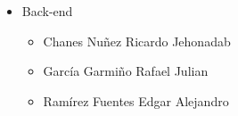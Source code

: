 \documentclass[12pt,letterpaper]{article}
\begin{document}
\begin{itemize}
\begin{itemize}
\begin{itemize}
\begin{itemize}
                                \end{itemize}
                                \item Back-end
                                \begin{itemize}
                                    \item Chanes Nuñez Ricardo Jehonadab
                                    \item García Garmiño Rafael Julian
                                    \item Ramírez Fuentes Edgar Alejandro
                                \end{itemize}
                            \end{itemize}
                        \end{itemize}
                \end{itemize}
\end{document}
